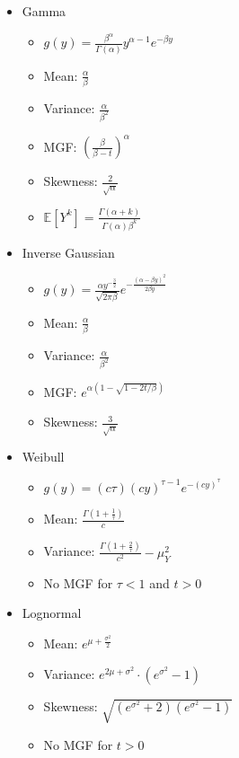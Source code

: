 \documentclass{article}
\begin{document}
\begin{itemize}
    \item Gamma
    \begin{itemize}
        \item $g(y) = \frac{\beta^\alpha}{\Gamma(\alpha)}y^{\alpha-1} e^{-\beta y}$
        \item Mean: $\frac{\alpha}{\beta}$
        \item Variance: $\frac{\alpha}{\beta^2}$
        \item MGF: $(\frac{\beta}{\beta-t})^\alpha$
        \item Skewness: $\frac{2}{\sqrt{\alpha}}$
        \item $\mathbb{E}[Y^k] = \frac{\Gamma(\alpha + k)}{\Gamma(\alpha) \beta^k}$
    \end{itemize}
    \item Inverse Gaussian
    \begin{itemize}
        \item $g(y) = \frac{\alpha y^{-\frac{3}{2}}}{\sqrt{2\pi \beta}}e^{- \frac{(\alpha - \beta y)^2}{2\beta y}}$
        \item Mean: $\frac{\alpha}{\beta}$
        \item Variance: $\frac{\alpha}{\beta^2}$
        \item MGF: $e^{\alpha(1 - \sqrt{1-2t/\beta})}$
        \item Skewness: $\frac{3}{\sqrt{\alpha}}$
    \end{itemize}
    \item Weibull
    \begin{itemize}
        \item $g(y) = (c\tau)(cy)^{\tau -1} e^{-(cy)^\tau}$
        \item Mean: $\frac{\Gamma(1+\frac{1}{\tau})}{c}$
        \item Variance: $\frac{\Gamma(1+\frac{2}{\tau})}{c^2} - \mu^2_Y$
        \item No MGF for $\tau <1$ and $t > 0$
    \end{itemize}
    \item Lognormal
    \begin{itemize}
        \item Mean: $e^{\mu + \frac{\sigma^2}{2}}$
        \item Variance: $e^{2\mu + \sigma^2}\cdot (e^{\sigma^2}-1)$
        \item Skewness: $\sqrt{(e^{\sigma^2}+2) (e^{\sigma^2} -1)}$
        \item No MGF for $t > 0$

\end{itemize}
\end{itemize}
\end{document}
